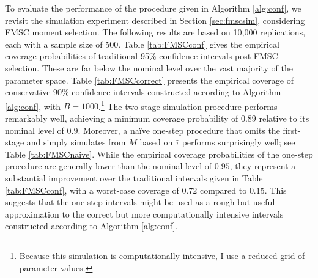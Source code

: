 \documentclass[12pt]{article}
\theoremstyle{definition}
\begin{document}
To evaluate the performance of the procedure given in Algorithm \ref{alg:conf}, we revisit the simulation experiment described in Section \ref{sec:fmscsim}, considering FMSC moment selection. The following results are based on 10,000 replications, each with a sample size of 500. Table \ref{tab:FMSCconf} gives the empirical coverage probabilities of traditional 95\% confidence intervals post-FMSC selection. These are far below the nominal level over the vast majority of the parameter space. Table \ref{tab:FMSCcorrect} presents the empirical coverage of conservative 90\% confidence intervals constructed according to Algorithm \ref{alg:conf}, with $B=1000$.\footnote{Because this simulation is computationally intensive, I use a reduced grid of parameter values.} The two-stage simulation procedure performs remarkably well, achieving a minimum coverage probability of $0.89$ relative to its nominal level of $0.9$. Moreover, a na\"{i}ve one-step procedure that omits the first-stage and simply simulates from $M$ based on $\widehat{\tau}$ performs surprisingly well; see Table \ref{tab:FMSCnaive}. While the empirical coverage probabilities of the one-step procedure are generally lower than the nominal level of $0.95$, they represent a substantial improvement over the traditional intervals given in Table \ref{tab:FMSCconf}, with a worst-case coverage of $0.72$ compared to $0.15$. This suggests that the one-step intervals might be used as a rough but useful approximation to the correct but more computationally intensive intervals constructed according to Algorithm \ref{alg:conf}.
\end{document}
